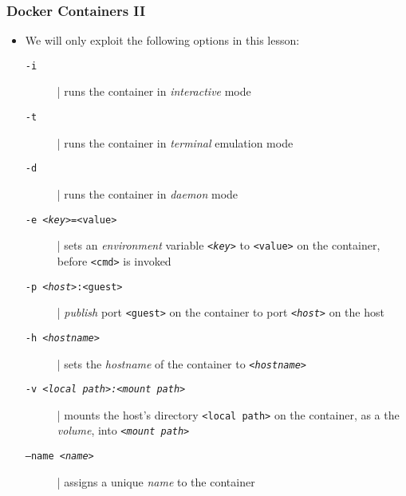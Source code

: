 \documentclass{beamer}\mode<presentation>{\usetheme{AMSBolognaFC}}
\begin{document}
\begin{frame}
\frametitle{Docker Containers II}
    \begin{itemize}
        \item We will only exploit the following options in this lesson:
        \begin{description}
            \item[\texttt{-i}] | runs the container in \emph{\alert{i}nteractive} mode

            \item[\texttt{-t}] | runs the container in \emph{\alert{t}erminal} emulation mode

            \item[\texttt{-d}] | runs the container in \emph{\alert{d}aemon} mode 

            \item[\texttt{-e \textit{<key>}=<value>}] | sets an \emph{\alert{e}nvironment} variable \texttt{\textit{<key>}} to \texttt{<value>} on the container, before \texttt{<cmd>} is invoked

            \item[\texttt{-p \textit{<host>}:<guest>}] | \emph{\alert{p}ublish} port \texttt{<guest>} on the container to port \texttt{\textit{<host>}} on the host

            \item[\texttt{-h \textit{<hostname>}}]  |  sets the \emph{\alert{h}ostname} of the container to \texttt{\textit{<hostname>}}

            \item[\texttt{-v \textit{<local path>:<mount path>}}]  |  mounts the host's directory \texttt{<local path>} on the container, as a the \emph{\alert{v}olume}, into \texttt{\textit{<mount path>}}

            \item[\texttt{--name \textit{<name>}}]  |  assigns a unique \emph{\alert{n}ame} to the container
        \end{description}

    \end{itemize}
\end{frame}
\end{document}

